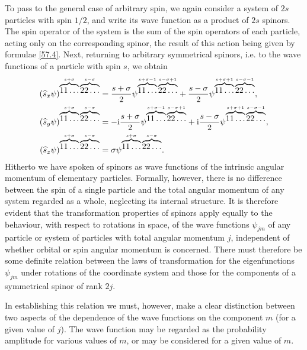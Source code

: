 To pass to the general case of arbitrary spin, we again consider a system of $ 2s $ particles with spin $ 1/2 $, and write its wave function as a product of $ 2s $ spinors. The spin operator of the system is the sum of the spin operators of each particle, acting only on the corresponding spinor, the result of this action being given by formulae \eqref{57.4}. Next, returning to arbitrary symmetrical spinors, i.e. to the wave functions of a particle with spin $ s $, we obtain
\begin{equation}\label{57.5}
\begin{split}
(\widehat{s}_x\psi)^{\overbrace{11\dots}^{s+\sigma}\overbrace{22\dots}^{s-\sigma}}&=\frac{s+\sigma}{2}\psi^{\overbrace{11\dots}^{s+\sigma-1}\overbrace{22\dots}^{s-\sigma+1}}+\frac{s-\sigma}{2}\psi^{\overbrace{11\dots}^{s+\sigma+1}\overbrace{22\dots}^{s-\sigma-1}},\\
(\widehat{s}_y\psi)^{\overbrace{11\dots}^{s+\sigma}\overbrace{22\dots}^{s-\sigma}}&=-\mathrm{i}\frac{s+\sigma}{2}\psi^{\overbrace{11\dots}^{s+\sigma-1}\overbrace{22\dots}^{s-\sigma+1}}+\mathrm{i}\frac{s-\sigma}{2}\psi^{\overbrace{11\dots}^{s+\sigma+1}\overbrace{22\dots}^{s-\sigma-1}},\\
(\widehat{s}_z\psi)^{\overbrace{11\dots}^{s+\sigma}\overbrace{22\dots}^{s-\sigma}}&=\sigma\psi^{\overbrace{11\dots}^{s+\sigma}\overbrace{22\dots}^{s-\sigma}}.
\end{split}
\end{equation}
Hitherto we have spoken of spinors as wave functions of the intrinsic angular momentum of elementary particles. Formally, however, there is no difference between the spin of a single particle and the total angular momentum of any system regarded as a whole, neglecting its internal structure. It is therefore evident that the transformation properties of spinors apply equally to the behaviour, with respect to rotations in space, of the wave functions $\psi_{jm}$ of any particle or system of particles with total angular momentum $ j $, independent of whether orbital or spin angular momentum is concerned. There must therefore be some definite relation between the laws of transformation for the eigenfunctions $\psi_{jm}$ under rotations of the coordinate system and those for the components of a symmetrical spinor of rank $ 2j $.

In establishing this relation we must, however, make a clear distinction between two aspects of the dependence of the wave functions on the component $ m $ (for a given value of $ j $). The wave function may be regarded as the probability amplitude for various values of $ m $, or may be considered for a given value of $ m $.

